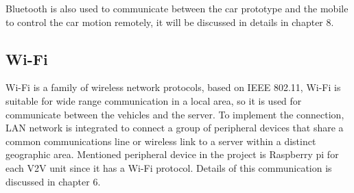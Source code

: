 Bluetooth is also used to communicate between the car prototype and the mobile to control the car motion remotely, it will be discussed in details in chapter 8.

\subsection{Wi-Fi}
Wi-Fi is a family of wireless network protocols, based on IEEE 802.11, Wi-Fi is suitable for wide range communication in a local area, so it is used for communicate between the vehicles and the server. \newline
To implement the connection, LAN network is integrated to connect a group of peripheral devices that share a common communications line or wireless link to a server within a distinct geographic area. \newline
Mentioned peripheral device in the project is Raspberry pi for each V2V unit since it has a Wi-Fi protocol. Details of this communication is discussed in chapter 6.

